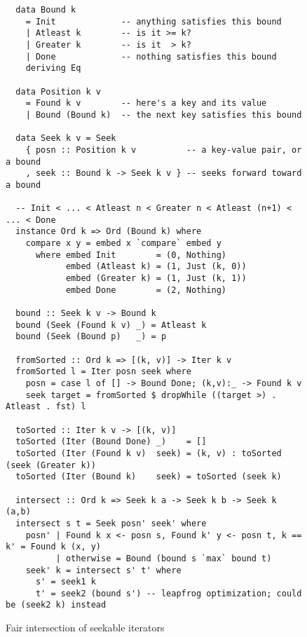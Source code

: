 \documentclass[acmsmall,screen,review,anonymous,dvipsnames,svgnames]{acmart}
\begin{document}
\begin{figure}
  \begin{verbatim}
  data Bound k
    = Init             -- anything satisfies this bound
    | Atleast k        -- is it >= k?
    | Greater k        -- is it  > k?
    | Done             -- nothing satisfies this bound
    deriving Eq

  data Position k v
    = Found k v        -- here's a key and its value
    | Bound (Bound k)  -- the next key satisfies this bound

  data Seek k v = Seek
    { posn :: Position k v          -- a key-value pair, or a bound
    , seek :: Bound k -> Seek k v } -- seeks forward toward a bound

  -- Init < ... < Atleast n < Greater n < Atleast (n+1) < ... < Done
  instance Ord k => Ord (Bound k) where
    compare x y = embed x `compare` embed y
      where embed Init        = (0, Nothing)
            embed (Atleast k) = (1, Just (k, 0))
            embed (Greater k) = (1, Just (k, 1))
            embed Done        = (2, Nothing)

  bound :: Seek k v -> Bound k
  bound (Seek (Found k v) _) = Atleast k
  bound (Seek (Bound p)   _) = p

  fromSorted :: Ord k => [(k, v)] -> Iter k v
  fromSorted l = Iter posn seek where
    posn = case l of [] -> Bound Done; (k,v):_ -> Found k v
    seek target = fromSorted $ dropWhile ((target >) . Atleast . fst) l

  toSorted :: Iter k v -> [(k, v)]
  toSorted (Iter (Bound Done) _)    = []
  toSorted (Iter (Found k v)  seek) = (k, v) : toSorted (seek (Greater k))
  toSorted (Iter (Bound k)    seek) = toSorted (seek k)

  intersect :: Ord k => Seek k a -> Seek k b -> Seek k (a,b)
  intersect s t = Seek posn' seek' where
    posn' | Found k x <- posn s, Found k' y <- posn t, k == k' = Found k (x, y)
          | otherwise = Bound (bound s `max` bound t)
    seek' k = intersect s' t' where
      s' = seek1 k
      t' = seek2 (bound s') -- leapfrog optimization; could be (seek2 k) instead
  \end{verbatim}
  \caption{Fair intersection of seekable iterators}
  \label{fig:fair-iterators}
\end{figure}



\end{document}
